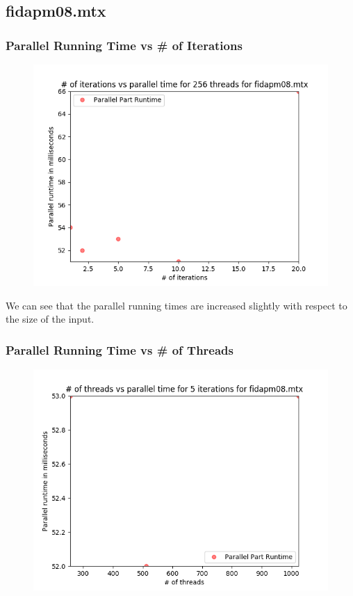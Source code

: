 \documentclass{article}
\begin{document}
\subsection{fidapm08.mtx}
\subsubsection{Parallel Running Time vs # of Iterations}

\begin{figure}[H]
\centering
\includegraphics[width=\linewidth]{assets/fidapm08_iter_parallel.png}
\label{fig:test1}
\vspace{-2pt}
\end{figure}

\null \qquad We can see that the parallel running times are increased slightly with respect to the size of the input.

\subsubsection{Parallel Running Time vs # of Threads}

\begin{figure}[H]
\centering
\includegraphics[width=\linewidth]{assets/fidapm08_thr_parallel.png}
\label{fig:test1}
\vspace{-2pt}
\end{figure}
\end{document}
